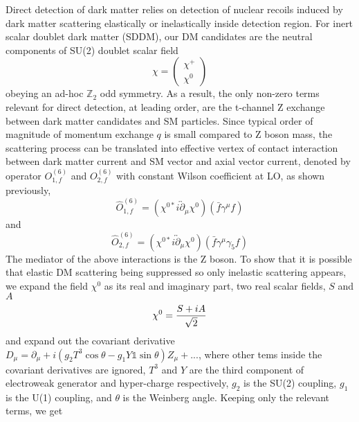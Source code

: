 \documentclass[12pt]{article}
\begin{document}
Direct detection of dark matter relies on detection of nuclear recoils induced by dark matter scattering elastically or inelastically inside detection region. For inert scalar doublet dark matter (SDDM), our DM candidates are the neutral components of SU(2) doublet scalar field 
\begin{equation} \label{chi}
\chi =
\begin{pmatrix}
\chi^+ \\
\chi^0
\end{pmatrix}
\end{equation}
 obeying an ad-hoc $\mathbb{Z}_2$ odd symmetry.  As a result, the only non-zero terms relevant for direct detection, at leading order, are the t-channel Z exchange between dark matter candidates and SM particles. Since typical order of magnitude of momentum exchange $q$ is small compared to Z boson mass, the scattering process can be translated into effective vertex of contact interaction between dark matter current and SM vector and axial vector current, denoted by operator $O_{1,f}^{(6)}$ and $O_{2,f}^{(6)}$ with constant Wilson coefficient at LO, as shown previously, 
\begin{equation} \label{Fermi1}
\hat O_{1,f}^{(6)} = (\chi^{0*} i \overleftrightarrow\partial_\mu \chi^{0} ) (\bar f \gamma^\mu f)
\end{equation}
and
\begin{equation}\label{Fermi2}
\hat O_{2,f}^{(6)} = (\chi^{0*} i \overleftrightarrow\partial_\mu \chi^{0} ) (\bar f \gamma^\mu \gamma_5 f)
\end{equation}
The mediator of the above interactions is the Z boson. To show that it is possible that elastic DM scattering being suppressed so only inelastic scattering appears, we expand the field $\chi^0$ as its real and imaginary part, two real scalar fields, $S$ and $A$
\begin{equation} \label{chi0}
\chi^0= \frac{S+iA}{\sqrt 2}\\
\end{equation}
and expand out the covariant derivative $D_\mu = \partial_\mu + i(g_2 T^3 \cos \theta - g_1 Y \mathbb{1} \sin \theta ) Z_\mu + ...$, where other tems inside the covariant derivatives are ignored, $T^3$ and $Y$ are the third component of electroweak generator and hyper-charge respectively, $g_2$ is the SU(2) coupling, $g_1$ is the U(1) coupling, and $\theta$ is the Weinberg angle. Keeping only the relevant terms, we get
\end{document}
